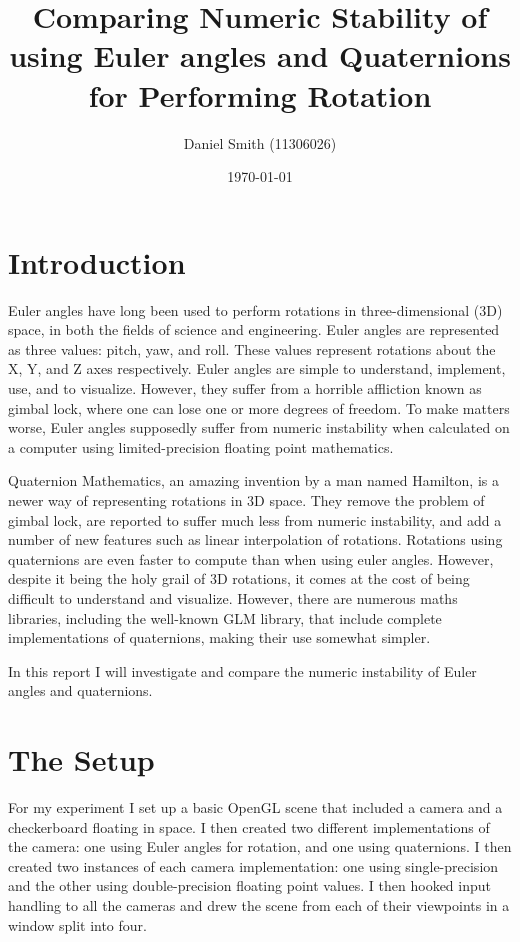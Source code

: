 \documentclass[a4paper]{article}
\title{Comparing Numeric Stability of using Euler angles and Quaternions for Performing Rotation}
\author{Daniel Smith (11306026)}
\date{\today}
\begin{document}
\maketitle

\section{Introduction}

Euler angles have long been used to perform rotations in three-dimensional (3D) space, in both the fields of science and engineering. Euler angles are represented as three values: pitch, yaw, and roll. These values represent rotations about the X, Y, and Z axes respectively. Euler angles are simple to understand, implement, use, and to visualize. However, they suffer from a horrible affliction known as gimbal lock, where one can lose one or more degrees of freedom. To make matters worse, Euler angles supposedly suffer from numeric instability when calculated on a computer using limited-precision floating point mathematics.

Quaternion Mathematics, an amazing invention by a man named Hamilton, is a newer way of representing rotations in 3D space. They remove the problem of gimbal lock, are reported to suffer much less from numeric instability, and add a number of new features such as linear interpolation of rotations. Rotations using quaternions are even faster to compute than when using euler angles. However, despite it being the holy grail of 3D rotations, it comes at the cost of being difficult to understand and visualize. However, there are numerous maths libraries, including the well-known GLM library, that include complete implementations of quaternions, making their use somewhat simpler.

In this report I will investigate and compare the numeric instability of Euler angles and quaternions.

\section{The Setup}

For my experiment I set up a basic OpenGL scene that included a camera and a checkerboard floating in space. I then created two different implementations of the camera: one using Euler angles for rotation, and one using quaternions. I then created two instances of each camera implementation: one using single-precision and the other using double-precision floating point values. I then hooked input handling to all the cameras and drew the scene from each of their viewpoints in a window split into four.
\end{document}
